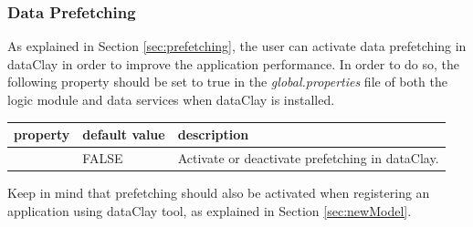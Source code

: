 \subsubsection{Data Prefetching}
\label{sec:prefetchingTuning}
As explained in Section \ref{sec:prefetching}, the user can activate data prefetching in dataClay in order to improve the application performance. In order to do so, the following property should be set to true in the \textit{global.properties} file of both the logic module and data services when dataClay is installed.

\begin{table}[H]
\footnotesize
\begin{tBox}
\centering
\begin{tabular}{p{57mm} | p{27mm} |  >{\raggedright\arraybackslash}p{50mm}}
\textbf{property} & \textbf{default value} & \textbf{description} \\
\hline
\verb PREFETCHING_ENABLED & FALSE & Activate or deactivate prefetching in dataClay. \\
\end{tabular}
\label{table:GarbageCollection}
\end{tBox}
\end{table}

Keep in mind that prefetching should also be activated when registering an application using dataClay tool, as explained in Section \ref{sec:newModel}.